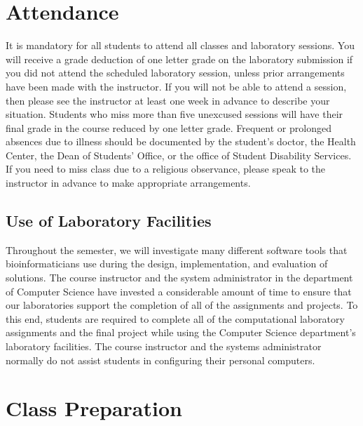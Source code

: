 \documentclass[11pt]{article} %
\begin{document}
\section*{\textbf{Attendance}}
It is mandatory for all students to attend all classes and laboratory sessions. You will receive a grade deduction of one letter grade on the laboratory submission if you did not attend the scheduled laboratory session, unless prior arrangements have been made with the instructor. If you will not be able to attend a session, then please see the instructor at least one week in advance to describe your situation. Students who miss more than five unexcused sessions will have their final grade in the course reduced by one letter grade. Frequent or prolonged absences due to illness should be documented by the student's doctor, the Health Center, the Dean of Students’ Office, or the office of Student Disability Services. If you need to miss class due to a religious observance, please speak to the instructor in advance to make appropriate arrangements.

\subsection*{\textbf{Use of Laboratory Facilities}}

Throughout the semester, we will investigate many different software tools that bioinformaticians use during the design, implementation, and evaluation of solutions. The course instructor and the system administrator in the department of Computer Science have invested a considerable amount of time to ensure that our laboratories support the completion of all of the assignments and projects. To this end, students are required to complete all of the computational laboratory assignments and the final project while using the Computer Science department's laboratory facilities. The course instructor and the systems administrator normally do not assist students in configuring their personal computers.

\section*{\textbf{Class Preparation}}
\end{document}
